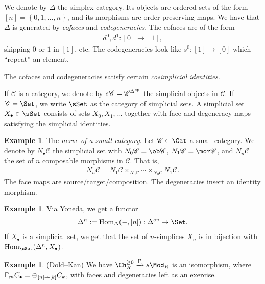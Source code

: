 \documentclass[12pt]{amsart}
\theoremstyle{definition}
\newtheorem{example}[theorem]{Example}
\begin{document}
We denote by $\Delta$ the simplex category. Its objects are ordered sets of the form $[n] = \left\{ 0,1, \ldots, n \right\}$, and its morphisms are order-preserving maps. We have that $\Delta$ is generated by \textit{cofaces} and \textit{codegeneracies}. The cofaces are of the form
\begin{align*}
    d^0,d^1: [0] \to [1],
\end{align*}
skipping $0$ or $1$ in $[1]$, etc. The codegeneracies look like $s^0 : [1] \to [0]$ which ``repeat'' an element.

The cofaces and codegeneracies satisfy certain \textit{cosimplicial identities}.

If $\mathscr{C}$ is a category, we denote by $s \mathscr{C} = \mathscr{C}^{\Delta^{\text{op}}}$ the simplicial objects in $\mathscr{C}$. If $\mathscr{C} = \Set$, we write $\sSet$ as the category of simplicial sets. A simplicial set $X_\bullet \in \sSet$ consists of sets $X_0, X_1, \ldots$ together with face and degeneracy maps satisfying the simplicial identities.

\begin{example} The \textit{nerve of a small category}. Let $\mathscr{C} \in \Cat$ a small category. We denote by $N_\bullet \mathscr{C}$ the simplicial set with $N_0 \mathscr{C} = \ob \mathscr{C}$, $N_1 \mathscr{C} = \mor \mathscr{C}$, and $N_n \mathscr{C}$ the set of $n$ composable morphisms in $\mathscr{C}$. That is,
\begin{align*}
    N_n \mathscr{C} = N_1 \mathscr{C} \times_{N_0 \mathscr{C}} \cdots \times_{N_0 \mathscr{C}} N_1 \mathscr{C}.
\end{align*}
The face maps are source/target/composition. The degeneracies insert an identity morphism.
\end{example}

\begin{example} Via Yoneda, we get a functor
\begin{align*}
    \Delta^n := \Hom_\Delta(-,[n]) : \Delta^\op \to \Set.
\end{align*}
If $X_\bullet$ is a simplicial set, we get that the set of $n$-simplices $X_n$ is in bijection with $\Hom_\sSet(\Delta^n, X_\bullet)$.
\end{example}

\begin{example} (Dold--Kan) We have $\Ch_R^{\ge 0} \xto{\Gamma} s\Mod_R$ is an isomorphism, where $\Gamma_m C_\bullet  =\oplus_{[n] \twoheadrightarrow [k]} C_k$, with faces and degeneracies left as an exercise.
\end{example}
\end{document}
